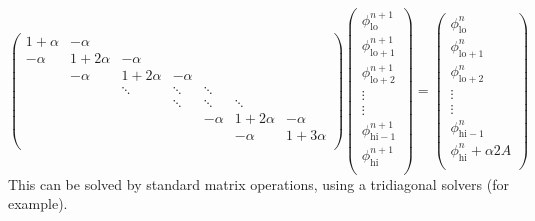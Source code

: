 \begin{equation}
\renewcommand\arraystretch{1.5}
\left (
\begin{array}{ccccccc}
1+\alpha &   -\alpha &           &        &         &           &          \\
-\alpha  & 1+2\alpha & -\alpha   &        &         &           &          \\
         & -\alpha   & 1+2\alpha & -\alpha&         &           &          \\
         &           & \ddots    & \ddots & \ddots  &           &          \\
         &           &           & \ddots & \ddots  & \ddots    &          \\
         &           &           &        & -\alpha & 1+2\alpha &-\alpha   \\
         &           &           &        &         & -\alpha   &1+3\alpha \\
\end{array}
\right )
\left (
\begin{array}{c}
\phi_\mathrm{lo}^{n+1} \\
\phi_\mathrm{lo+1}^{n+1} \\
\phi_\mathrm{lo+2}^{n+1} \\
\vdots \\
\vdots \\
\phi_\mathrm{hi-1}^{n+1} \\
\phi_\mathrm{hi}^{n+1} \\
\end{array}
\right )
=
\left (
\begin{array}{c}
\phi_\mathrm{lo}^{n} \\
\phi_\mathrm{lo+1}^{n} \\
\phi_\mathrm{lo+2}^{n} \\
\vdots \\
\vdots \\
\phi_\mathrm{hi-1}^{n} \\
\phi_\mathrm{hi}^{n} + \alpha 2 A\\
\end{array}
\right )
\end{equation}
This can be solved by standard matrix operations, using a tridiagonal
solvers (for example).


